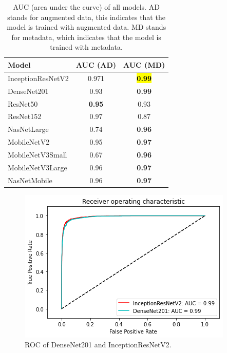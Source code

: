 \documentclass[sensors,article,accept,pdftex,moreauthors]{Definitions/mdpi}
\begin{document}
	\begin{table}[H]
			\caption{AUC (area under the curve) of all models. AD stands for augmented data, this indicates that the model is trained with augmented data. MD stands for metadata, which indicates that the model is trained with metadata.}
		\label{table:overall-auc}
	\setlength{\tabcolsep}{12.3mm}\begin{tabular}{ l  c  c  }
\toprule
\textbf{Model} & \textbf{AUC (AD)} & \textbf{AUC (MD)}\\ 
\midrule
InceptionResNetV2 & 0.971 & \textbf{\hl{0.99} %
}\\
\midrule
DenseNet201 & 0.93 & \textbf{0.99}\\
\midrule
ResNet50 & \textbf{0.95} & 0.93 \\
\midrule
ResNet152 & 0.97 & 0.87\\
\midrule
NasNetLarge & 0.74 & \textbf{0.96}\\
\midrule
MobileNetV2 & 0.95 & \textbf{0.97}\\
\midrule
MobileNetV3Small & 0.67 & \textbf{0.96}\\
\midrule
MobileNetV3Large & 0.96 & \textbf{0.97}\\
\midrule
NasNetMobile & 0.96 & \textbf{0.97}\\
\bottomrule
		\end{tabular}
	\end{table}\unskip
		\begin{figure}[H]
		\centering
		\includegraphics[width=.9\linewidth]{Definitions/ROC/denvsirv2}
		\caption{ROC of DenseNet201 and InceptionResNetV2.}\label{fig:densevsirv2}
	\end{figure}
			
\end{document}
